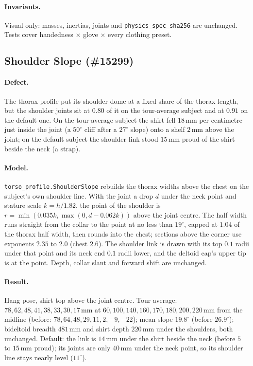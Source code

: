 \paragraph{Invariants.} Visual only: masses, inertias, joints and
\texttt{physics\_spec\_sha256} are unchanged. Tests cover handedness
$\times$ glove $\times$ every clothing preset.

\subsection{Shoulder Slope (\#15299)}
\paragraph{Defect.} The thorax profile put its shoulder dome at a fixed share
of the thorax length, but the shoulder joints sit at $0.80$ of it on the
tour-average subject and at $0.91$ on the default one. On the tour-average
subject the shirt fell $18$\,mm per centimetre just inside the joint (a
$50^\circ$ cliff after a $27^\circ$ slope) onto a shelf $2$\,mm above the
joint; on the default subject the shoulder link stood $15$\,mm proud of the
shirt beside the neck (a strap).
\paragraph{Model.} \texttt{torso\_profile.ShoulderSlope} rebuilds the thorax
widths above the chest on the subject's own shoulder line. With the joint a
drop $d$ under the neck point and stature scale $k = h / 1.82$, the point of
the shoulder is $r = \min(0.035k, \max(0, d - 0.062k))$ above the joint
centre. The half width runs straight from the collar to the point at no less
than $19^\circ$, capped at $1.04$ of the thorax half width, then rounds into
the chest; sections above the corner use exponents $2.35$ to $2.0$ (chest
$2.6$). The shoulder link is drawn with its top $0.1$ radii under that point
and its neck end $0.1$ radii lower, and the deltoid cap's upper tip is at the
point. Depth, collar slant and forward shift are unchanged.
\paragraph{Result.} Hang pose, shirt top above the joint centre.
Tour-average: $78, 62, 48, 41, 38, 33, 30, 17$\,mm at $60, 100, 140, 160, 170,
180, 200, 220$\,mm from the midline (before: $78, 64, 48, 29, 11, 2, -9,
-22$); mean slope $19.8^\circ$ (before $26.9^\circ$); bideltoid breadth
$481$\,mm and shirt depth $220$\,mm under the shoulders, both unchanged.
Default: the link is $14$\,mm under the shirt beside the neck (before $5$ to
$15$\,mm proud); its joints are only $40$\,mm under the neck point, so its
shoulder line stays nearly level ($11^\circ$).
